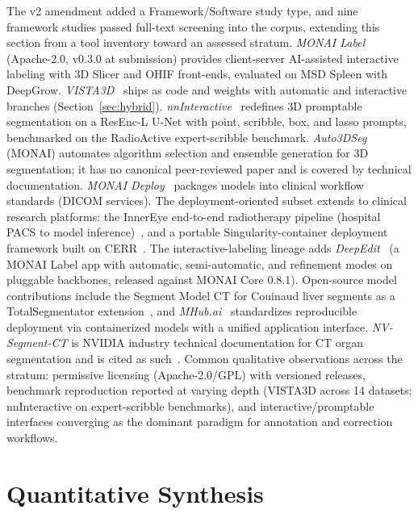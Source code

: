 The v2 amendment added a Framework/Software study type, and nine framework studies passed full-text screening into the corpus, extending this section from a tool inventory toward an assessed stratum. \emph{MONAI Label}~\cite{yang2023monailabel} (Apache-2.0, v0.3.0 at submission) provides client-server AI-assisted interactive labeling with 3D Slicer and OHIF front-ends, evaluated on MSD Spleen with DeepGrow. \emph{VISTA3D}~\cite{he2024vista3d} ships as code and weights with automatic and interactive branches (Section~\ref{sec:hybrid}). \emph{nnInteractive}~\cite{isensee2025nninteractive} redefines 3D promptable segmentation on a ResEnc-L U-Net with point, scribble, box, and lasso prompts, benchmarked on the RadioActive expert-scribble benchmark. \emph{Auto3DSeg}~\cite{myronenko2023auto3dseg} (MONAI) automates algorithm selection and ensemble generation for 3D segmentation; it has no canonical peer-reviewed paper and is covered by technical documentation. \emph{MONAI Deploy}~\cite{diazpinto2023monaideploy} packages models into clinical workflow standards (DICOM services). The deployment-oriented subset extends to clinical research platforms: the InnerEye end-to-end radiotherapy pipeline (hospital PACS to model inference)~\cite{oktay2020evaluationof}, and a portable Singularity-container deployment framework built on CERR~\cite{anonxxxxportableframework}. The interactive-labeling lineage adds \emph{DeepEdit}~\cite{andres2022deepeditdeep} (a MONAI Label app with automatic, semi-automatic, and refinement modes on pluggable backbones, released against MONAI Core 0.8.1). Open-source model contributions include the Segment Model CT for Couinaud liver segments as a TotalSegmentator extension~\cite{nicoli2025liversegment}, and \emph{MHub.ai}~\cite{nrnberg2026mhubai} standardizes reproducible deployment via containerized models with a unified application interface. \emph{NV-Segment-CT} is NVIDIA industry technical documentation for CT organ segmentation and is cited as such~\cite{nvidia2026nvsegmentct}. Common qualitative observations across the stratum: permissive licensing (Apache-2.0/GPL) with versioned releases, benchmark reproduction reported at varying depth (VISTA3D across 14 datasets; nnInteractive on expert-scribble benchmarks), and interactive/promptable interfaces converging as the dominant paradigm for annotation and correction workflows.

\FloatBarrier

\section{Quantitative Synthesis}
\label{sec:synthesis}

